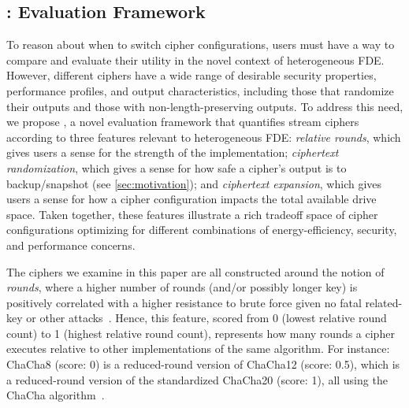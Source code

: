 \subsection{\sysC: Evaluation Framework}\label{subsec:des-trade}

To reason about when to switch cipher configurations, users must have a way to
compare and evaluate their utility in the novel context of heterogeneous FDE.
However, different ciphers have a wide range of desirable security properties,
performance profiles, and output characteristics, including those that randomize
their outputs and those with non-length-preserving outputs. To address this
need, we propose \sysC, a novel evaluation framework that quantifies stream
ciphers according to three features relevant to heterogeneous FDE: {\em relative
rounds}, which gives users a sense for the strength of the implementation;
{\em ciphertext randomization}, which gives a sense for how safe a cipher's
output is to backup/snapshot (see \cref{sec:motivation}); and {\em ciphertext
expansion}, which gives users a sense for how a cipher configuration impacts the
total available drive space. Taken together, these features illustrate a rich
tradeoff space of cipher configurations optimizing for different combinations of
energy-efficiency, security, and performance concerns.


 The ciphers we examine in this paper are all
constructed around the notion of {\em rounds}, where a higher number of rounds
(and/or possibly longer key) is positively correlated with a higher resistance
to brute force given no fatal related-key or other
attacks~\cite{ChaCha-Cryptanalysis}. Hence, this feature, scored from 0 (lowest
relative round count) to 1 (highest relative round count), represents how many
rounds a cipher executes relative to other implementations of the same
algorithm. For instance: ChaCha8 (score: 0) is a reduced-round version of
ChaCha12 (score: 0.5), which is a reduced-round version of the standardized
ChaCha20 (score: 1), all using the ChaCha
algorithm~\cite{ChaCha20,ChaCha-Cryptanalysis}.



